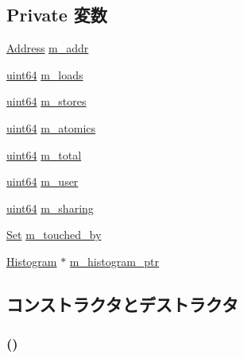 \subsection*{Private 変数}
\begin{DoxyCompactItemize}
\item 
\hyperlink{classAddress}{Address} \hyperlink{classAccessTraceForAddress_a82a0fb091bb145547996e49b5ee3dde2}{m\_\-addr}
\item 
\hyperlink{TypeDefines_8hh_a29940ae63ec06c9998bba873e25407ad}{uint64} \hyperlink{classAccessTraceForAddress_ae62f2a92a6f690a36ae0b5ced2d59436}{m\_\-loads}
\item 
\hyperlink{TypeDefines_8hh_a29940ae63ec06c9998bba873e25407ad}{uint64} \hyperlink{classAccessTraceForAddress_abcc38814f3109146f39c33101a05acfa}{m\_\-stores}
\item 
\hyperlink{TypeDefines_8hh_a29940ae63ec06c9998bba873e25407ad}{uint64} \hyperlink{classAccessTraceForAddress_a1ea551bccefc550ef504659581af39e2}{m\_\-atomics}
\item 
\hyperlink{TypeDefines_8hh_a29940ae63ec06c9998bba873e25407ad}{uint64} \hyperlink{classAccessTraceForAddress_af87f35ffb1854fd41c3a82edaf4a9ff7}{m\_\-total}
\item 
\hyperlink{TypeDefines_8hh_a29940ae63ec06c9998bba873e25407ad}{uint64} \hyperlink{classAccessTraceForAddress_a4050103e54b773a2c5905995b437c5cf}{m\_\-user}
\item 
\hyperlink{TypeDefines_8hh_a29940ae63ec06c9998bba873e25407ad}{uint64} \hyperlink{classAccessTraceForAddress_a540937c20ba2f2895bc4a5bb3aac19dd}{m\_\-sharing}
\item 
\hyperlink{classSet}{Set} \hyperlink{classAccessTraceForAddress_a4949c45d0cddbcbbefb81cc89c85cf17}{m\_\-touched\_\-by}
\item 
\hyperlink{classHistogram}{Histogram} $\ast$ \hyperlink{classAccessTraceForAddress_ab6bcc5b2b4ee7d5b76f8bb879015abcc}{m\_\-histogram\_\-ptr}
\end{DoxyCompactItemize}


\subsection{コンストラクタとデストラクタ}
\hypertarget{classAccessTraceForAddress_a39e3c32f62a22b90aae6b635958cd33b}{
\subsubsection[{AccessTraceForAddress}]{ ()}}
\label{classAccessTraceForAddress_a39e3c32f62a22b90aae6b635958cd33b}




